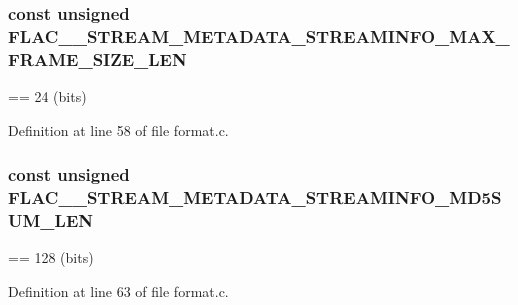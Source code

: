 \subsubsection[{\texorpdfstring{F\+L\+A\+C\+\_\+\+\_\+\+S\+T\+R\+E\+A\+M\+\_\+\+M\+E\+T\+A\+D\+A\+T\+A\+\_\+\+S\+T\+R\+E\+A\+M\+I\+N\+F\+O\+\_\+\+M\+A\+X\+\_\+\+F\+R\+A\+M\+E\+\_\+\+S\+I\+Z\+E\+\_\+\+L\+EN}{FLAC__STREAM_METADATA_STREAMINFO_MAX_FRAME_SIZE_LEN}}]{ {\bf const} unsigned F\+L\+A\+C\+\_\+\+\_\+\+S\+T\+R\+E\+A\+M\+\_\+\+M\+E\+T\+A\+D\+A\+T\+A\+\_\+\+S\+T\+R\+E\+A\+M\+I\+N\+F\+O\+\_\+\+M\+A\+X\+\_\+\+F\+R\+A\+M\+E\+\_\+\+S\+I\+Z\+E\+\_\+\+L\+EN}\hypertarget{group__flac__format_gaa206d2c029642f1ad22b101f071d010b}{}\label{group__flac__format_gaa206d2c029642f1ad22b101f071d010b}
== 24 (bits) 

Definition at line 58 of file format.\+c.

\subsubsection[{\texorpdfstring{F\+L\+A\+C\+\_\+\+\_\+\+S\+T\+R\+E\+A\+M\+\_\+\+M\+E\+T\+A\+D\+A\+T\+A\+\_\+\+S\+T\+R\+E\+A\+M\+I\+N\+F\+O\+\_\+\+M\+D5\+S\+U\+M\+\_\+\+L\+EN}{FLAC__STREAM_METADATA_STREAMINFO_MD5SUM_LEN}}]{ {\bf const} unsigned F\+L\+A\+C\+\_\+\+\_\+\+S\+T\+R\+E\+A\+M\+\_\+\+M\+E\+T\+A\+D\+A\+T\+A\+\_\+\+S\+T\+R\+E\+A\+M\+I\+N\+F\+O\+\_\+\+M\+D5\+S\+U\+M\+\_\+\+L\+EN}\hypertarget{group__flac__format_ga35030375a8c77a3799bceea07f95b221}{}\label{group__flac__format_ga35030375a8c77a3799bceea07f95b221}
== 128 (bits) 

Definition at line 63 of file format.\+c.

